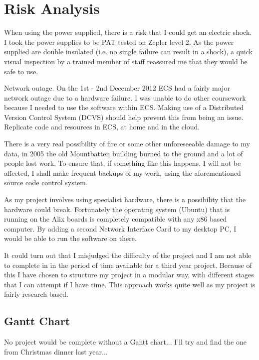 \documentclass[12pt]{report}
\begin{document}
\section{Risk Analysis}

When using the power supplied, there is a risk that I could get an electric
shock. I took the power supplies to be PAT tested on Zepler level 2. As the
power supplied are double insulated (i.e. no single failure can result in a
shock), a quick visual inspection by a trained member of staff reassured me that
they would be safe to use. 

Network outage. On the 1st - 2nd December 2012 ECS had a fairly major network
outage due to a hardware failure. I was unable to do other coursework because I
needed to use the software within ECS. Making use of a Distributed Version
Control System (DCVS) should help prevent this from being an issue. Replicate
code and resources in ECS, at home and in the cloud. 

There is a very real possibility of fire or some other unforeseeable damage to my
data, in 2005 the old Mountbatten building burned to the ground and a lot of
people lost work. To ensure that, if something like this happens, I will not be
affected, I shall make frequent backups of my work, using the aforementioned
source code control system.

As my project involves using specialist hardware, there is a possibility that
the hardware could break. Fortunately the operating system (Ubuntu) that is running on
the Alix boards is completely compatible with any x86 based computer. By adding
a second Network Interface Card to my desktop PC, I would be able to run the
software on there. 

It could turn out that I misjudged the difficulty of the project and I am not
able to complete in in the period of time available for a third year project.
Because of this I have chosen to structure my project in a modular way, with
different stages that I can attempt if I have time. This approach works quite
well as my project is fairly research based. 

\pagebreak

\begin{landscape}

\section{Gantt Chart}
No project would be complete without a Gantt chart... I'll try and find the one
from Christmas dinner last year...

\end{landscape}
\end{document}
